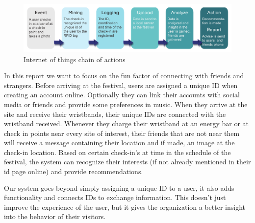 \begin{figure}[h!]
\centering
\includegraphics[width=1\textwidth]{IoT.pdf}
\caption{Internet of things chain of actions}
\label{fig:iot}
\end{figure}
%
In this report we want to focus on the fun factor of connecting with friends and strangers. Before arriving at the festival, users are assigned a unique ID when creating an account online. Optionally they can link their accounts with social media or friends and provide some preferences in music. When they arrive at the site and receive their wristbands, their unique IDs are connected with the wristband received. Whenever they charge their wristband at an energy bar or at check in points near every site of interest, their friends that are not near them will receive a message containing their location and if made, an image at the check-in location. Based on certain check-in's at time in the schedule of the festival, the system can recognize their interests (if not already mentioned in their id page online) and provide recommendations.

Our system goes beyond simply assigning a unique ID to a user, it also adds functionality and connects IDs to exchange information. This doesn't just improve the experience of the user, but it gives the organization a better insight into the behavior of their visitors.










